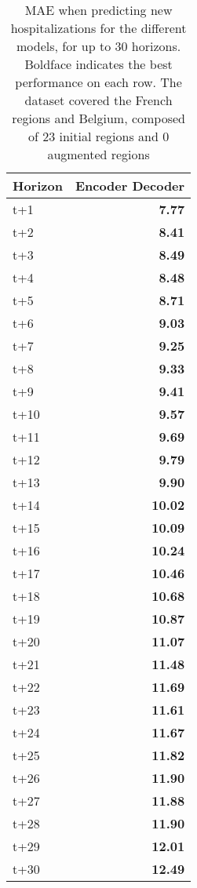 \begin{table}[H]
\centering
\caption{MAE when predicting new hospitalizations for the different models, for up to 30 horizons. Boldface indicates the best performance on each row. The dataset covered the French regions and Belgium, composed of 23 initial regions and 0 augmented regions }
\label{tab:MAE_comparison}
\begin{tabular}{lr}
\toprule
Horizon &  Encoder Decoder \\
\midrule
t+1  & \textbf{7.77}  \\
t+2  & \textbf{8.41}  \\
t+3  & \textbf{8.49}  \\
t+4  & \textbf{8.48}  \\
t+5  & \textbf{8.71}  \\
t+6  & \textbf{9.03}  \\
t+7  & \textbf{9.25}  \\
t+8  & \textbf{9.33}  \\
t+9  & \textbf{9.41}  \\
t+10  & \textbf{9.57}  \\
t+11  & \textbf{9.69}  \\
t+12  & \textbf{9.79}  \\
t+13  & \textbf{9.90}  \\
t+14  & \textbf{10.02}  \\
t+15  & \textbf{10.09}  \\
t+16  & \textbf{10.24}  \\
t+17  & \textbf{10.46}  \\
t+18  & \textbf{10.68}  \\
t+19  & \textbf{10.87}  \\
t+20  & \textbf{11.07}  \\
t+21  & \textbf{11.48}  \\
t+22  & \textbf{11.69}  \\
t+23  & \textbf{11.61}  \\
t+24  & \textbf{11.67}  \\
t+25  & \textbf{11.82}  \\
t+26  & \textbf{11.90}  \\
t+27  & \textbf{11.88}  \\
t+28  & \textbf{11.90}  \\
t+29  & \textbf{12.01}  \\
t+30  & \textbf{12.49}  \\

\bottomrule
\end{tabular}
\end{table}
